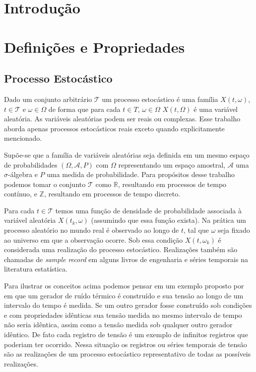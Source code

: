 \chapter*{Introdução}
\label{sec:teorica_classica_series_temporais_introducao}

\chapter{Definições e Propriedades}
\label{chap:teorica_classica_series_temporais_definicoes}

\section{Processo Estocástico}\label{sec:process}

Dado um conjunto arbitrário $\mathcal{T}$ um processo estocástico é uma família
${X(t,\omega)}$, $ t\in \mathcal{T}$ e $\omega \in \Omega$ de forma que para
cada $t \in T$, $\omega \in \Omega$ $X(t, \Omega)$ é uma variável aleatória. As
variáveis aleatórias podem ser reais ou complexas. Esse trabalho aborda apenas
processos estocásticos reais exceto quando explicitamente mencionado.

Supõe-se que a família de variáveis aleatórias seja definida em um mesmo
espaço de probabilidades $(\Omega, \mathcal{A}, P)$ com $\Omega$ representando
um espaço amostral, $\mathcal{A}$ uma $\sigma$-álgebra e $P$ uma medida de
probabilidade. Para propósitos desse trabalho podemos tomar o conjunto
$\mathcal{T}$ como $\mathbb{R}$, resultando em processos de tempo contínuo, e
$\mathbb{Z}$, resultando em processos de tempo discreto.

Para cada $t \in \mathcal{T}$ temos uma função de densidade de probabilidade
associada à variável aleatória $X(t_k, \omega)$ (assumindo que essa função exista).
Na prática um processo aleatório no mundo real é observado ao longo de $t$, tal que
$\omega$ seja fixado ao universo em que a observação ocorre. Sob essa condição
$X(t, \omega_k)$ é considerada uma realização do processo estocástico. Realizações também
são chamadas de \emph{sample record} em alguns livros de engenharia
e séries temporais na literatura estatística.

Para ilustrar os conceitos acima podemos pensar em um exemplo proposto por
~\cite{random_data} em que um gerador de ruído térmico é construído e sua tensão
ao longo de um intervalo do tempo é medida. Se um outro gerador fosse
construído sob condições e com propriedades idênticas sua tensão medida no
mesmo intervalo de tempo não seria idêntica, assim como a tensão medida sob
qualquer outro gerador idêntico. De fato cada registro de tensão é um exemplo
de infinitos registros que poderiam ter ocorrido. Nessa situação os registros
ou séries temporais de tensão são as realizações de um processo estocástico
representativo de todas as possíveis realizações.

